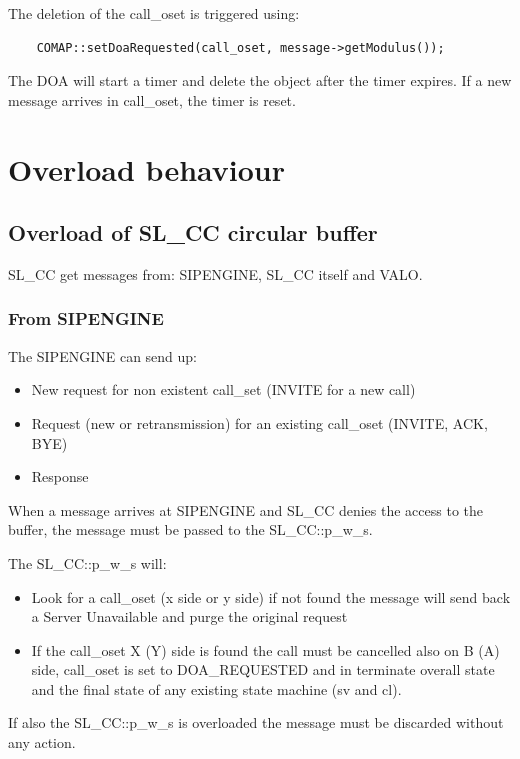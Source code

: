 \documentclass[a4paper]{article}
\begin{document}
The deletion of the call\_oset is triggered using:
\begin{verbatim}
	COMAP::setDoaRequested(call_oset, message->getModulus());
\end{verbatim} 

The DOA will start a timer and delete the object after the timer expires. If a new message arrives in call\_oset, the timer is reset.

\section{Overload behaviour}

\subsection{Overload of SL\_CC circular buffer}

SL\_CC get messages from: SIPENGINE, SL\_CC itself and VALO.
\subsubsection{From SIPENGINE}
The SIPENGINE can send up:
\begin{itemize}
\item New request for non existent call\_set (INVITE for a new call)
\item Request (new or retransmission) for an existing call\_oset (INVITE, ACK, BYE)
\item Response 
\end{itemize}

When a message arrives at SIPENGINE and SL\_CC denies the access to the buffer, the message must
be passed to the SL\_CC::p\_w\_s.

The SL\_CC::p\_w\_s will:

\begin{itemize}
\item Look for a call\_oset (x side or y side) if not found the message
will send back a Server Unavailable and purge the original request
\item If the call\_oset X (Y) side is found the call must be cancelled also on B (A) side, call\_oset is set to DOA\_REQUESTED
and in terminate overall state and the final state of any existing state machine (sv and cl).
\end{itemize}

If also the SL\_CC::p\_w\_s is overloaded the message must be discarded without any action.
\end{document}
